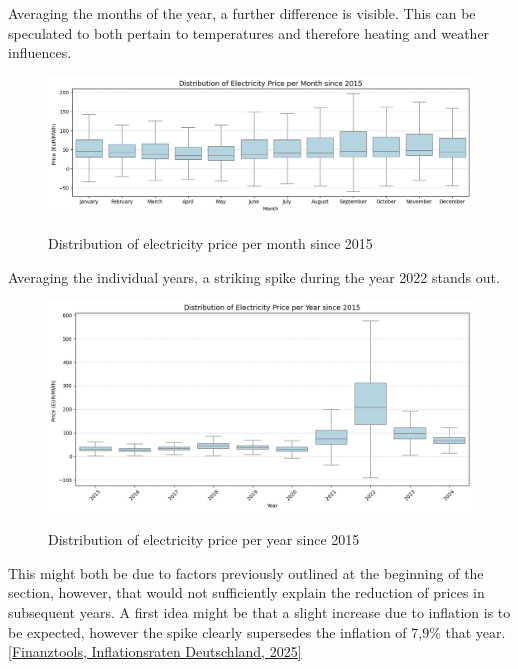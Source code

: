 \documentclass[a4paper]{article}
\begin{document}
Averaging the months of the year, a further difference is visible. This
can be speculated to both pertain to temperatures and therefore heating
and weather influences.

\begin{figure}
\centering
{\includegraphics[keepaspectratio]{src/image-7.png}}
\caption{Distribution of electricity price per month since 2015}
\end{figure}

Averaging the individual years, a striking spike during the year 2022
stands out.

\begin{figure}
\centering
{\includegraphics[keepaspectratio]{src/image-5.png}}
\caption{Distribution of electricity price per year since 2015}
\end{figure}

This might both be due to factors previously outlined at the beginning
of the section, however, that would not sufficiently explain the
reduction of prices in subsequent years. A first idea might be that a
slight increase due to inflation is to be expected, however the spike
clearly supersedes the inflation of 7,9\% that year. \hyperref[bibliography]{[Finanztools, Inflationsraten Deutschland, 2025]}
\end{document}
